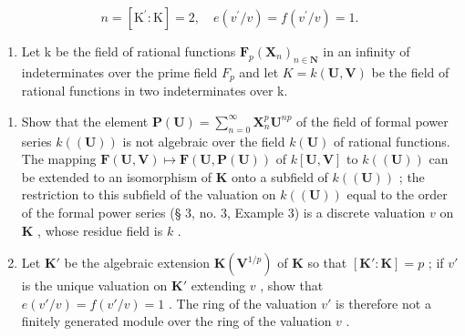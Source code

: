 \[
n = \left[ \mathrm{K} ^ {\prime}: \mathrm{K} \right] = 2, \quad e (v ^ {\prime} / v) = f (v ^ {\prime} / v) = 1.
\]

\begin{enumerate}
\def\labelenumi{\arabic{enumi}.}
\setcounter{enumi}{2}
\tightlist
\item
  Let k be the field of rational functions \(\mathbf{F}_{p}(\mathbf{X}_{n})_{n\in\mathbf{N}}\) in an infinity of indeterminates over the prime field \(F_{p}\) and let \(K = k(\mathbf{U}, \mathbf{V})\) be the field of rational functions in two indeterminates over k.
\end{enumerate}

\begin{enumerate}
\def\labelenumi{(\alph{enumi})}
\item
  Show that the element \(\mathbf{P}(\mathbf{U}) = \sum_{n=0}^{\infty} \mathbf{X}_n^p \mathbf{U}^{np}\) of the field of formal power series \(k((\mathbf{U}))\) is not algebraic over the field \(k(\mathbf{U})\) of rational functions. The mapping \(\mathbf{F}(\mathbf{U}, \mathbf{V}) \mapsto \mathbf{F}(\mathbf{U}, \mathbf{P}(\mathbf{U}))\) of \(k[\mathbf{U}, \mathbf{V}]\) to \(k((\mathbf{U}))\) can be extended to an isomorphism of \(\mathbf{K}\) onto a subfield of \(k((\mathbf{U}))\) ; the restriction to this subfield of the valuation on \(k((\mathbf{U}))\) equal to the order of the formal power series (§ 3, no. 3, Example 3) is a discrete valuation \(v\) on \(\mathbf{K}\) , whose residue field is \(k\) .
\item
  Let \(\mathbf{K}'\) be the algebraic extension \(\mathbf{K}(\mathbf{V}^{1/p})\) of \(\mathbf{K}\) so that \([\mathbf{K}':\mathbf{K}] = p\) ; if \(v'\) is the unique valuation on \(\mathbf{K}'\) extending \(v\) , show that \(e(v'/v) = f(v'/v) = 1\) . The ring of the valuation \(v'\) is therefore not a finitely generated module over the ring of the valuation \(v\) .
\end{enumerate}

